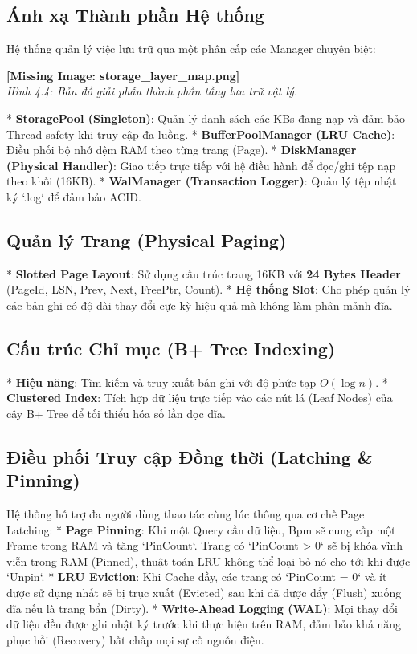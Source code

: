\subsection{Ánh xạ Thành phần Hệ thống}

Hệ thống quản lý việc lưu trữ qua một phân cấp các Manager chuyên biệt:

\textbf{[Missing Image: storage_layer_map.png]}\\ \textit{Hình 4.4: Bản đồ giải phẫu thành phần tầng lưu trữ vật lý.}

*   \textbf{StoragePool (Singleton)}: Quản lý danh sách các KBs đang nạp và đảm bảo Thread-safety khi truy cập đa luồng.
*   \textbf{BufferPoolManager (LRU Cache)}: Điều phối bộ nhớ đệm RAM theo từng trang (Page).
*   \textbf{DiskManager (Physical Handler)}: Giao tiếp trực tiếp với hệ điều hành để đọc/ghi tệp nạp theo khối (16KB).
*   \textbf{WalManager (Transaction Logger)}: Quản lý tệp nhật ký `.log` để đảm bảo ACID.

\subsection{Quản lý Trang (Physical Paging)}

*   \textbf{Slotted Page Layout}: Sử dụng cấu trúc trang 16KB với \textbf{24 Bytes Header} (PageId, LSN, Prev, Next, FreePtr, Count).
*   \textbf{Hệ thống Slot}: Cho phép quản lý các bản ghi có độ dài thay đổi cực kỳ hiệu quả mà không làm phân mảnh đĩa.

\subsection{Cấu trúc Chỉ mục (B+ Tree Indexing)}

*   \textbf{Hiệu năng}: Tìm kiếm và truy xuất bản ghi với độ phức tạp $O(\log n)$.
*   \textbf{Clustered Index}: Tích hợp dữ liệu trực tiếp vào các nút lá (Leaf Nodes) của cây B+ Tree để tối thiểu hóa số lần đọc đĩa.

\subsection{Điều phối Truy cập Đồng thời (Latching & Pinning)}

Hệ thống hỗ trợ đa người dùng thao tác cùng lúc thông qua cơ chế Page Latching:
*   \textbf{Page Pinning}: Khi một Query cần dữ liệu, Bpm sẽ cung cấp một Frame trong RAM và tăng `PinCount`. Trang có `PinCount > 0` sẽ bị khóa vĩnh viễn trong RAM (Pinned), thuật toán LRU không thể loại bỏ nó cho tới khi được `Unpin`.
*   \textbf{LRU Eviction}: Khi Cache đầy, các trang có `PinCount = 0` và ít được sử dụng nhất sẽ bị trục xuất (Evicted) sau khi đã được đẩy (Flush) xuống đĩa nếu là trang bẩn (Dirty).
*   \textbf{Write-Ahead Logging (WAL)}: Mọi thay đổi dữ liệu đều được ghi nhật ký trước khi thực hiện trên RAM, đảm bảo khả năng phục hồi (Recovery) bất chấp mọi sự cố nguồn điện.

